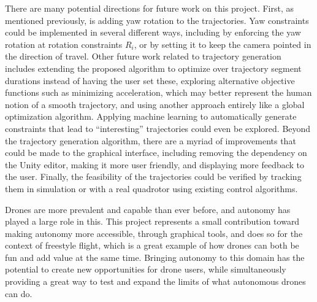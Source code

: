 \documentclass[pageno]{jpaper}
\newcommand{\quotes}[1]{``#1''}
\begin{document}
There are many potential directions for future work on this project. First, as mentioned previously, is adding yaw rotation to the trajectories. Yaw constraints could be implemented in several different ways, including by enforcing the yaw rotation at rotation constraints $R_i$, or by setting it to keep the camera pointed in the direction of travel. Other future work related to trajectory generation includes extending the proposed algorithm to optimize over trajectory segment durations instead of having the user set these, exploring alternative objective functions such as minimizing acceleration, which may better represent the human notion of a smooth trajectory, and using another approach entirely like a global optimization algorithm. Applying machine learning to automatically generate constraints that lead to \quotes{interesting} trajectories could even be explored. Beyond the trajectory generation algorithm, there are a myriad of improvements that could be made to the graphical interface, including removing the dependency on the Unity editor, making it more user friendly, and displaying more feedback to the user. Finally, the feasibility of the trajectories could be verified by tracking them in simulation or with a real quadrotor using existing control algorithms.

Drones are more prevalent and capable than ever before, and autonomy has played a large role in this. This project represents a small contribution toward making autonomy more accessible, through graphical tools, and does so for the context of freestyle flight, which is a great example of how drones can both be fun and add value at the same time. Bringing autonomy to this domain has the potential to create new opportunities for drone users, while simultaneously providing a great way to test and expand the limits of what autonomous drones can do.




\end{document}
